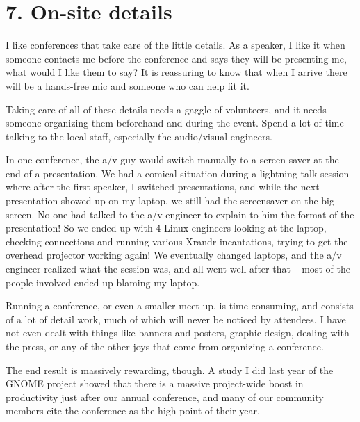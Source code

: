 \section*{7. On-site details}

I like conferences that take care of the little details. As a speaker, I
like it when someone contacts me before the conference and says they will
be presenting me, what would I like them to say? It is reassuring to know
that when I arrive there will be a hands-free mic and someone who can
help fit it.

Taking care of all of these details needs a gaggle of volunteers, and it
needs someone organizing them beforehand and during the event. Spend a
lot of time talking to the local staff, especially the audio/visual
engineers.

In one conference, the a/v guy would switch manually to a screen-saver
at the end of a presentation. We had a comical situation during a
lightning talk session where after the first speaker, I switched
presentations, and while the next presentation showed up on my laptop,
we still had the screensaver on the big screen. No-one had talked to the
a/v engineer to explain to him the format of the presentation!
So we ended up with 4 Linux engineers looking at the laptop, checking
connections and running various Xrandr incantations, trying to get the
overhead projector working again! We eventually changed laptops, and the
a/v engineer realized what the session was, and all went well after that
-- most of the people involved ended up blaming my laptop.

Running a conference, or even a smaller meet-up, is time consuming, and
consists of a lot of detail work, much of which will never be noticed by
attendees. I have not even dealt with things like banners and posters,
graphic design, dealing with the press, or any of the other joys that
come from organizing a conference.

The end result is massively rewarding, though. A study I did last year
of the GNOME project showed that there is a massive project-wide boost
in productivity just after our annual conference, and many of our
community members cite the conference as the high point of their year.

